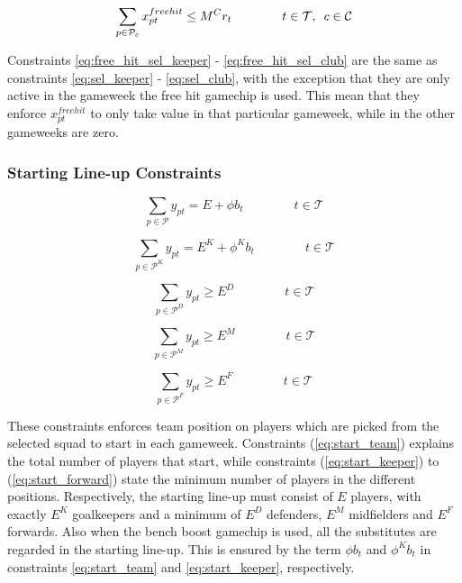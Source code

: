 \begin{equation} \label{eq:free_hit_sel_club}
    \sum_{p \in \mathcal{P}_{c}} x_{pt}^{free hit} \leq M^{C}r_{t} \qquad\qquad t \in \mathcal{T}, \enskip   c \in \mathcal{C}
\end{equation}


Constraints \eqref{eq:free_hit_sel_keeper} - \eqref{eq:free_hit_sel_club} are the same as constraints \eqref{eq:sel_keeper} - \eqref{eq:sel_club}, with the exception that they are only active in the gameweek the free hit gamechip is used. This mean that they enforce $x^{freehit}_{pt}$ to only take value in that particular gameweek, while in the other gameweeks are zero. 

\subsubsection{Starting Line-up Constraints}\label{team_start}

\begin{equation} \label{eq:start_team}
    \sum_{p \in \mathcal{P}}y_{pt}= E  + \phi b_{t} \qquad\qquad t \in \mathcal{T}
\end{equation}

\begin{equation}\label{eq:start_keeper}
    \sum_{p \in \mathcal{P}^{K}} y_{pt}= E^{K} + \phi^{K} b_{t} \qquad\qquad t \in \mathcal{T}
\end{equation}

\begin{equation} \label{eq:start_defender}
    \sum_{p \in \mathcal{P}^{D}} y_{pt} \geq E^{D}  \qquad\qquad t \in \mathcal{T}
\end{equation}

\begin{equation}\label{eq:start_midfielder}
    \sum_{p \in \mathcal{P}^{M}} y_{pt}\geq E^{M} \qquad\qquad t \in \mathcal{T}
\end{equation}

\begin{equation}\label{eq:start_forward}
    \sum_{p \in \mathcal{P}^{F}} y_{pt}\geq E^{F} \qquad\qquad t \in \mathcal{T}
\end{equation}

These constraints enforces team position on players which are picked from the selected squad to start in each gameweek. Constraints (\ref{eq:start_team}) explains the total number of players that start, while constraints (\ref{eq:start_keeper}) to (\ref{eq:start_forward}) state the minimum number of players in the different positions. Respectively, the starting line-up must consist of $E$ players, with exactly $E^{K}$ goalkeepers and a minimum of $E^{D}$ defenders, $E^{M}$ midfielders and $E^{F}$ forwards. Also when the bench boost gamechip is used, all the substitutes are regarded in the starting line-up. This is ensured by the term $\phi b_{t}$ and $\phi^{K} b_{t}$ in constraints \eqref{eq:start_team} and \eqref{eq:start_keeper}, respectively.  


